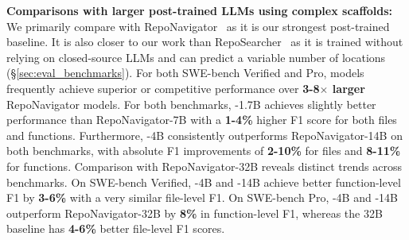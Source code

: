 \textbf{Comparisons with larger post-trained LLMs using complex scaffolds:} We primarily compare \methodname with RepoNavigator~\citep{zhang2025one} as it is our strongest post-trained baseline. It is also closer to our work than  RepoSearcher~\citep{ma2025toolintegratedreinforcementlearningrepo} as it is trained without relying on closed-source LLMs and can predict a variable number of locations (\S\ref{sec:eval_benchmarks}). For both SWE-bench Verified and Pro, \methodname models frequently achieve superior or competitive performance over \textbf{3-8$\times$ larger} RepoNavigator models. For both benchmarks, \methodname-1.7B achieves slightly better performance than RepoNavigator-7B  with a \textbf{1-4\%} higher F1 score for both files and functions. Furthermore, \methodname-4B consistently outperforms RepoNavigator-14B on both benchmarks, with absolute F1 improvements of \textbf{2-10\%} for files and \textbf{8-11\%} for functions. Comparison with RepoNavigator-32B reveals distinct trends across benchmarks. On SWE-bench Verified, \methodname-4B and \methodname-14B achieve better function-level F1 by \textbf{3-6\%} with a very similar file-level F1. On SWE-bench Pro, \methodname-4B and \methodname-14B outperform RepoNavigator-32B by \textbf{8\%} in function-level F1, whereas the 32B baseline has \textbf{4-6\%} better file-level F1 scores.

